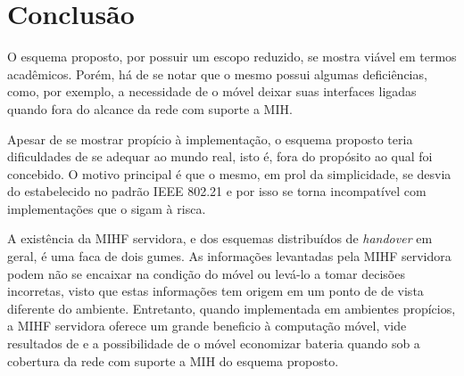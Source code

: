 \documentclass[12pt]{article}
\begin{document}

\section{Conclusão} %

O esquema proposto, por possuir um escopo reduzido, se mostra viável em termos 
acadêmicos.  Porém, há de se notar que o mesmo possui algumas deficiências, 
como, por exemplo, a necessidade de o móvel deixar suas interfaces ligadas 
quando fora do alcance da rede com suporte a MIH.

Apesar de se mostrar propício à implementação, o esquema proposto teria 
dificuldades de se adequar ao mundo real, isto é, fora do propósito ao qual 
foi concebido. O motivo principal é que o mesmo, em prol da simplicidade, se 
desvia do estabelecido no padrão IEEE 802.21 e por isso se torna incompatível 
com implementações que o sigam à risca.

A existência da MIHF servidora, e dos esquemas distribuídos de 
\textit{handover} em geral, é uma faca de dois gumes.  As informações 
levantadas pela MIHF servidora podem não se encaixar na condição do móvel ou 
levá-lo a tomar decisões incorretas, visto que estas informações tem origem em 
um ponto de de vista diferente do ambiente. Entretanto, quando implementada em 
ambientes propícios, a MIHF servidora oferece um grande beneficio à computação 
móvel, vide resultados de \cite{tawil:2008} e a possibilidade de o móvel 
economizar bateria quando sob a cobertura da rede com suporte a MIH do esquema 
proposto.



%
%
%







%
%



%


\end{document}
